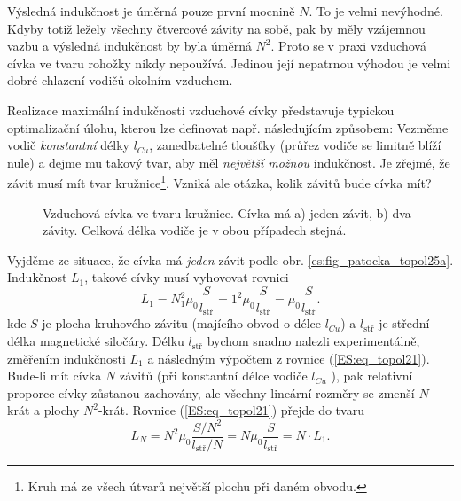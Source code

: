         Výsledná indukčnost je úměrná pouze první mocnině \(N\). To je velmi nevýhodné. Kdyby totiž 
        ležely všechny čtvercové závity na sobě, pak by měly vzájemnou vazbu a výsledná indukčnost 
        by byla úměrná \(N^2\). Proto se v praxi vzduchová cívka ve tvaru rohožky nikdy nepoužívá. 
        Jedinou její nepatrnou výhodou je velmi dobré chlazení vodičů okolním vzduchem.
        
        Realizace maximální indukčnosti vzduchové cívky představuje typickou optimalizační úlohu, 
        kterou lze definovat např. následujícím způsobem: Vezměme vodič \emph{konstantní} délky 
        \(l_{Cu}\), zanedbatelné tloušťky (průřez vodiče se limitně blíží nule) a dejme mu takový 
        tvar, aby měl \emph{největší možnou} indukčnost. Je zřejmé, že závit musí mít tvar 
        kružnice\footnote{Kruh má ze všech útvarů největší plochu při daném obvodu.}. 
        Vzniká ale otázka, kolik závitů bude cívka mít?
    
        \begin{figure}[ht!]
          \centering  
          \caption{ Vzduchová cívka ve tvaru kružnice. Cívka má a) jeden závit, b) dva závity. 
                    Celková délka vodiče je v obou případech stejná. \cite[s.~61]{Patocka4}} 
          \label{es:fig_patocka_topol25}
        \end{figure}
        
        Vyjděme ze situace, že cívka má \emph{jeden} závit podle obr. 
        \ref{es:fig_patocka_topol25a}. Indukčnost \(L_1\), takové cívky musí vyhovovat rovnici
        \begin{equation}\label{ES:eq_topol21}
          L_1 = N_1^2\mu_0\frac{S}{l_{\text{stř}}} = 1^2\mu_0\frac{S}{l_{\text{stř}}} 
              = \mu_0\frac{S}{l_{\text{stř}}}.
        \end{equation} 
        kde \(S\) je plocha kruhového závitu (majícího obvod o délce \(l_{Cu}\)) a
        \(l_{\text{stř}}\) je střední délka magnetické siločáry. Délku \(l_{\text{stř}}\) bychom
        snadno nalezli experimentálně, změřením indukčnosti \(L_1\) a následným výpočtem z rovnice
        (\ref{ES:eq_topol21}). Bude-li mít cívka \(N\) závitů (při konstantní délce vodiče
        \(l_{Cu}\) ), pak relativní proporce cívky zůstanou zachovány, ale všechny lineární rozměry
        se zmenší \(N\)-krát a plochy \(N^2\)-krát. Rovnice (\ref{ES:eq_topol21}) přejde do tvaru
        \begin{equation}\label{ES:eq_topol22}
          L_N = N^2\mu_0\frac{S/N^2}{l_{\text{stř}}/N} = N\mu_0\frac{S}{l_{\text{stř}}} 
              = N\cdot L_1.
        \end{equation} 
        
